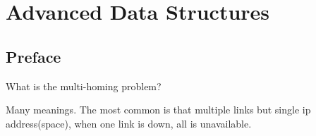 %
%
%

\chapter{Advanced Data Structures}
\label{intro} %


\section{Preface}
\label{sec:1}

What is the multi-homing problem?

Many meanings. The most common is that multiple links but single ip address(space), when one link is down, all is unavailable.


